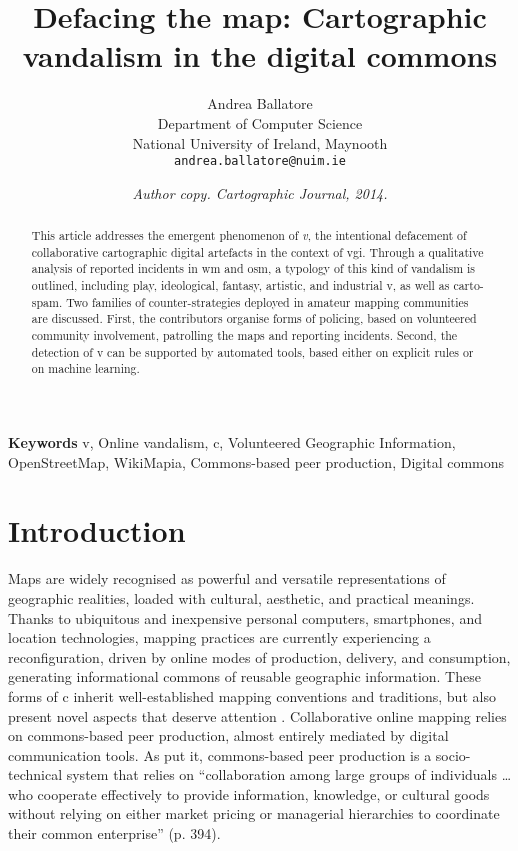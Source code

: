 \documentclass{article} \usepackage{graphicx,xspace}
\title{Defacing the map: Cartographic vandalism in the digital commons}
\date{\small\textit{Author copy. Cartographic Journal, 2014.}}
\author{
Andrea Ballatore\\
Department of Computer Science\\
National University of Ireland, Maynooth\\
\texttt{andrea.ballatore@nuim.ie}
}
\begin{document}
\maketitle

\begin{abstract}


\noindent This article addresses the emergent phenomenon of \emph{\gls{v}}, the intentional defacement of collaborative cartographic digital artefacts in the context of  \gls{vgi}.
Through a qualitative analysis of reported incidents in \gls{wm} and \gls{osm}, a typology  of this kind of vandalism is outlined, including
play,  
ideological, 
fantasy, 
artistic, and  
industrial \gls{v}, as well as carto-spam.
Two families of counter-stra\-te\-gies deployed in amateur mapping communities are discussed.
First, the contributors organise forms of policing, based on volunteered community involvement, patrolling the maps and reporting incidents.
Second, the detection of \gls{v} can be supported by automated tools, based either on explicit rules or on machine learning.


\end{abstract}
\vspace{1em}
\noindent\textbf{Keywords} \Gls{v}, Online vandalism, \Gls{c}, Volunteered Geographic Information, OpenStreetMap, WikiMapia, Commons-based peer production, Digital commons   

\newpage

\section{Introduction}
\label{sec:intro}
\glsresetall

Maps are widely recognised as powerful and versatile representations of geographic realities, loaded with cultural, aesthetic, and practical meanings.
Thanks to ubiquitous and inexpensive personal computers, smartphones, and location technologies, mapping practices are currently experiencing a reconfiguration, driven by online modes of production, delivery, and consumption, generating informational commons of reusable geographic information.
These forms of \gls{c} inherit well-established mapping conventions and traditions, but also present novel aspects that deserve attention \citep{dodge:2013:mappingexp}.
Collaborative online mapping relies on commons-based peer production, almost entirely mediated by digital communication tools.
As \cite{benkler:2006:commons} put it, commons-based peer production is a socio-technical system that relies on ``collaboration among large groups of individuals \ldots who cooperate effectively to provide information, knowledge, or cultural goods without relying on either market pricing or managerial hierarchies to coordinate their common enterprise'' (p. 394).
\end{document}

